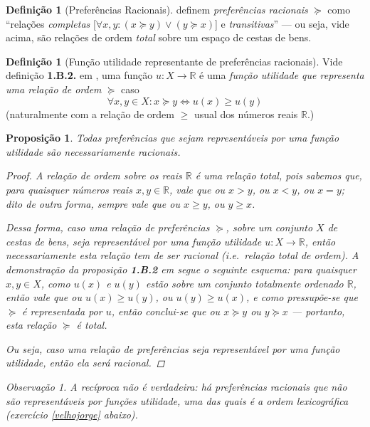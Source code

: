 \documentclass[12pt]{article}
\numberwithin{equation}{section}
\theoremstyle{plain}
\newtheorem{proposition}[theorem]{Proposição}
\theoremstyle{definition}
\newtheorem{definition}[theorem]{Definição}
\theoremstyle{remark}
\newtheorem*{remark}{Observação}
\begin{document}
\begin{definition}[Preferências Racionais]
  
  \textcite{Mas-Colell1995} definem \emph{preferências racionais} \(\succeq\) como
  ``relações \emph{completas} [\(\forall x,y: (x \succeq y) \lor (y \succeq x)\)] e \emph{transitivas}'' --- ou seja, vide acima, são relações de ordem \emph{total} sobre um espaço de cestas de bens.
\end{definition}

\begin{definition}[Função utilidade representante de preferências racionais]
  
  Vide definição \textbf{1.B.2.} em \textcite{Mas-Colell1995}, uma função
  \(u: X \to \mathbb{R}\) é uma \emph{função utilidade que representa uma
relação de ordem} \(\succeq\) caso \[
  \forall x, y \in X: x \succeq y \iff u(x) \geq u(y)
  \] (naturalmente com a relação de ordem \(\geq\) usual dos números reais
  \(\mathbb{R}\).)
\end{definition}
  

\begin{proposition}
  Todas preferências que sejam representáveis por uma função utilidade são necessariamente racionais.

  \begin{proof}
    A relação de ordem sobre os reais \(\mathbb{R}\) \emph{é uma relação
    total}, pois sabemos que, para quaisquer números reais
    \(x, y \in \mathbb{R}\), vale que ou \(x>y\), ou \(x<y\), ou \(x=y\);
    dito de outra forma, sempre vale que ou \(x \geq y\), ou \(y\geq x\).
      
    Dessa forma, caso uma relação de preferências \(\succeq\), sobre um
    conjunto \(X\) de cestas de bens, seja representável por uma função
    utilidade \(u:X \to \mathbb{R}\), então \emph{necessariamente} esta
    relação tem de ser \emph{racional} (i.e.~relação \emph{total} de ordem).
    A demonstração da proposição \textbf{1.B.2} em \textcite{Mas-Colell1995} segue o
    seguinte esquema: para quaisquer \(x, y \in X\), como \(u(x)\) e
    \(u(y)\) estão sobre um conjunto totalmente ordenado \(\mathbb{R}\),
    então vale que ou \(u(x) \geq u(y)\), ou \(u(y) \geq u(x)\), e como
    pressupõe-se que \(\succeq\) é representada por \(u\), então conclui-se
    que ou \(x \succeq y\) ou \(y \succeq x\) --- portanto, esta relação
    \(\succeq\) é total.
    
    Ou seja, caso uma relação de preferências seja representável por uma
    função utilidade, então ela será racional.
  \end{proof}

  \begin{remark}
    A recíproca não é verdadeira:
    há preferências racionais que não são representáveis por funções
    utilidade, uma das quais é a ordem lexicográfica (exercício \ref{velhojorge} abaixo).    
  \end{remark}
\end{proposition}
\end{document}
